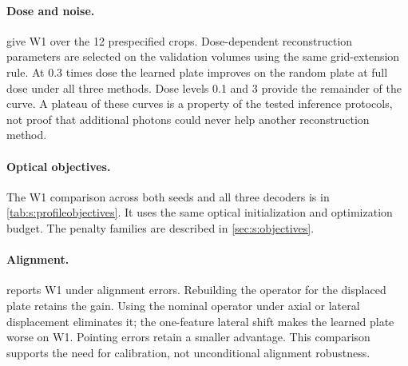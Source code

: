\paragraph{Dose and noise.}  give W1 over the 12 prespecified crops. Dose-dependent reconstruction parameters are selected on the validation volumes using the same grid-extension rule. At 0.3 times dose the learned plate improves on the random plate at full dose under all three methods. Dose levels 0.1 and 3 provide the remainder of the curve. A plateau of these curves is a property of the tested inference protocols, not proof that additional photons could never help another reconstruction method.

\begin{table}[t]
\centering\small
\coltab{}
\caption{Axial W1 ($\mu$m) versus deposited excitation dose at $C=8$. Parameters are reselected on validation data for each condition.}
\label{tab:s:profiledose}
\end{table}

\begin{table}[t]
\centering\small
\coltab{}
\caption{Axial W1 ($\mu$m) with background/read noise or reduced dose. Reductions compare paired means; intervals use cell resampling.}
\label{tab:s:profilenoise}
\end{table}

\paragraph{Optical objectives.} The W1 comparison across both seeds and all three decoders is in \cref{tab:s:profileobjectives}. It uses the same optical initialization and optimization budget. The penalty families are described in \cref{sec:s:objectives}.

\begin{table}[t]
\centering\small
\coltab{}
\caption{W1 reduction of our plate against each alternative objective ($C=8$, 12 prespecified crops). Seeds differ in optimization sampling. Counts refer to crops with lower W1.}
\label{tab:s:profileobjectives}
\end{table}

\paragraph{Alignment.}  reports W1 under alignment errors. Rebuilding the operator for the displaced plate retains the gain. Using the nominal operator under axial or lateral displacement eliminates it; the one-feature lateral shift makes the learned plate worse on W1. Pointing errors retain a smaller advantage. This comparison supports the need for calibration, not unconditional alignment robustness.

